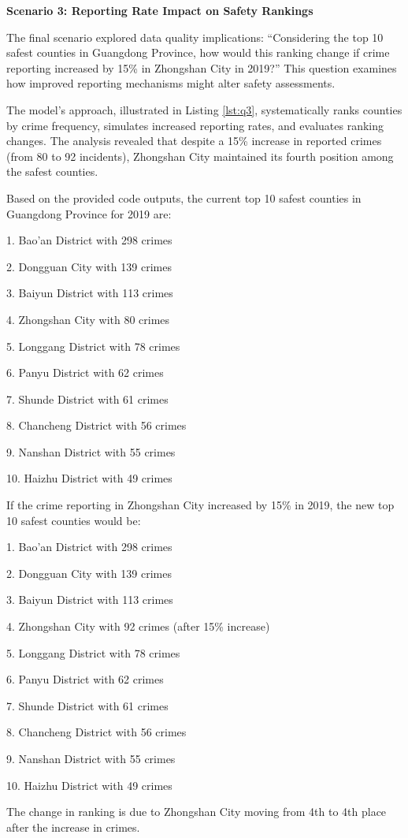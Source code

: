 \noindent \textbf{Scenario 3: Reporting Rate Impact on Safety Rankings}

The final scenario explored data quality implications: ``Considering the top 10 safest counties in Guangdong Province, how would this ranking change if crime reporting increased by 15\% in Zhongshan City in 2019?'' This question examines how improved reporting mechanisms might alter safety assessments.

The model's approach, illustrated in Listing \ref{lst:q3}, systematically ranks counties by crime frequency, simulates increased reporting rates, and evaluates ranking changes. The analysis revealed that despite a 15\% increase in reported crimes (from 80 to 92 incidents), Zhongshan City maintained its fourth position among the safest counties.



\begin{tcolorbox}[colback=white!95!black, colframe=black, title=Q3 Response, fontupper=\scriptsize, boxsep=2pt, left=3pt, right=3pt]
  Based on the provided code outputs, the current top 10 safest counties in Guangdong Province for 2019 are:

  1. Bao'an District with 298 crimes

  2. Dongguan City with 139 crimes
  
  3. Baiyun District with 113 crimes
  
  4. Zhongshan City with 80 crimes
  
  5. Longgang District with 78 crimes
  
  6. Panyu District with 62 crimes
  
  7. Shunde District with 61 crimes
  
  8. Chancheng District with 56 crimes
  
  9. Nanshan District with 55 crimes
  
  10. Haizhu District with 49 crimes

  If the crime reporting in Zhongshan City increased by 15\% in 2019, the new top 10 safest counties would be:

  1. Bao'an District with 298 crimes

  2. Dongguan City with 139 crimes

  3. Baiyun District with 113 crimes

  4. Zhongshan City with 92 crimes (after 15\% increase)

  5. Longgang District with 78 crimes

  6. Panyu District with 62 crimes

  7. Shunde District with 61 crimes

  8. Chancheng District with 56 crimes

  9. Nanshan District with 55 crimes

  10. Haizhu District with 49 crimes

  The change in ranking is due to Zhongshan City moving from 4th to 4th place after the increase in crimes.
\end{tcolorbox}


